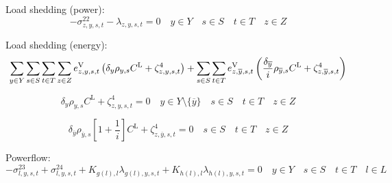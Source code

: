 \documentclass{article}
\newcommand{\sYears}{Y}
\newcommand{\sScenarios}{S}
\newcommand{\sIntervals}{T}
\newcommand{\sZones}{Z}
\newcommand{\sLinks}{L}
\newcommand{\iYear}{y}
\newcommand{\iYearTerminal}{\overline{\iYear}}
\newcommand{\iScenario}{s}
\newcommand{\iInterval}{t}
\newcommand{\iZone}{z}
\newcommand{\iLink}{l}
\newcommand{\cScenarioDuration}[1][\iYear,\iScenario]{\rho_{#1}}
\newcommand{\cInterestRate}{i}
\newcommand{\cIncidenceMatrix}[1][\iZone,\iLink]{K_{#1}}
\newcommand{\cLostLoadCost}{C^{\mathrm{L}}}
\newcommand{\cDiscountRate}[1][\iYear]{\delta_{#1}}
\newcommand{\vLostLoadEnergy}[1][\iZone,\iYear,\iScenario,\iInterval]{e^{\mathrm{V}}_{#1}}
\newcommand{\dNonNegativeLostLoad}[1][\iZone,\iYear,\iScenario,\iInterval]{\sigma_{#1}^{22}}
\newcommand{\dMinPowerFlow}[1][\iLink,\iYear,\iScenario,\iInterval]{\sigma_{#1}^{23}}
\newcommand{\dMaxPowerFlow}[1][\iLink,\iYear,\iScenario,\iInterval]{\sigma_{#1}^{24}}
\newcommand{\dPowerBalance}[1][\iZone,\iYear,\iScenario,\iInterval]{\lambda_{#1}}
\newcommand{\dLostLoadEnergy}[1][\iZone,\iYear,\iScenario,\iInterval]{\zeta_{#1}^{4}}
\begin{document}
Load shedding (power):
\begin{equation}
- \dNonNegativeLostLoad - \dPowerBalance = 0 \quad \iYear \in \sYears \quad \iScenario \in \sScenarios \quad \iInterval \in \sIntervals \quad \iZone \in \sZones
\end{equation}

Load shedding (energy):
\begin{equation}
\sumIntervals \sum\limits_{\iZone \in \sZones} \vLostLoadEnergy \left(\cDiscountRate \cScenarioDuration \cLostLoadCost + \dLostLoadEnergy \right) + \sum\limits_{\iScenario \in \sScenarios}\sum\limits_{\iInterval \in \sIntervals} \vLostLoadEnergy[\iZone,\iYearTerminal,\iScenario,\iInterval] \left( \frac{\cDiscountRate[\iYearTerminal]}{\cInterestRate} \cScenarioDuration[\iYearTerminal,\iScenario] \cLostLoadCost + \dLostLoadEnergy[\iZone,\iYearTerminal,\iScenario,\iInterval] \right)
\end{equation}

\begin{equation}
\cDiscountRate \cScenarioDuration \cLostLoadCost + \dLostLoadEnergy = 0 \quad \iYear \in \sYears \setminus \{\iYearTerminal\} \quad \iScenario \in \sScenarios \quad \iInterval \in \sIntervals \quad \iZone \in \sZones
\end{equation}

\begin{equation}
\cDiscountRate[\iYearTerminal] \cScenarioDuration[\iYearTerminal,\iScenario] \left[1 + \frac{1}{\cInterestRate}\right] \cLostLoadCost + \dLostLoadEnergy[\iZone,\iYearTerminal,\iScenario,\iInterval] = 0 \quad \iScenario \in \sScenarios \quad \iInterval \in \sIntervals \quad \iZone \in \sZones
\end{equation}

Powerflow:
\begin{equation}
-\dMinPowerFlow + \dMaxPowerFlow + \cIncidenceMatrix[g(\iLink), \iLink] \dPowerBalance[g(\iLink),\iYear,\iScenario,\iInterval] + \cIncidenceMatrix[h(\iLink), \iLink] \dPowerBalance[h(\iLink),\iYear,\iScenario,\iInterval] = 0 \quad \iYear \in \sYears \quad \iScenario \in \sScenarios \quad \iInterval \in \sIntervals \quad \iLink \in \sLinks
\end{equation}

\end{document}
